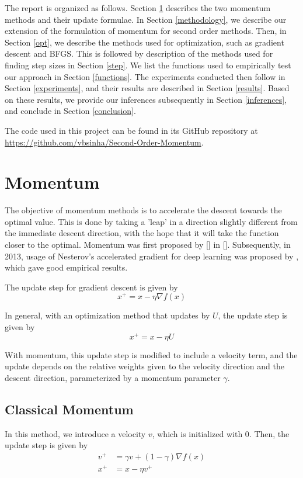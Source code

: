 \documentclass{article}
\begin{document}
The report is organized as follows. Section \ref{momentum} describes the two momentum methods and their update formulae. In Section \ref{methodology}, we describe our extension of the formulation of momentum for second order methods. Then, in Section \ref{opt}, we describe the methods used for optimization, such as gradient descent and BFGS. This is followed by description of the methods used for finding step sizes in Section \ref{step}. We list the functions used to empirically test our approach in Section \ref{functions}. The experiments conducted then follow in Section \ref{experiments}, and their results are described in Section \ref{results}. Based on these results, we provide our inferences subsequently in Section \ref{inferences}, and conclude in Section \ref{conclusion}.

The code used in this project can be found in its GitHub repository at \url{https://github.com/vbsinha/Second-Order-Momentum}.

\section{Momentum}\label{momentum}

The objective of momentum methods is to accelerate the descent towards the optimal value. This is done by taking a 'leap' in a direction slightly different from the immediate descent direction, with the hope that it will take the function closer to the optimal.
Momentum was first proposed by [] in []. Subsequently, in 2013, usage of Nesterov's accelerated gradient for deep learning was proposed by \citet{Sutskever}, which gave good empirical results.

The update step for gradient descent is given by
\begin{equation}
x^+ = x - \eta \nabla f(x)
\end{equation}

In general, with an optimization method that updates by $U$, the update step is given by
\begin{equation}
x^+ = x - \eta U
\end{equation}

With momentum, this update step is modified to include a velocity term, and the update depends on the relative weights given to the velocity direction and the descent direction, parameterized by a momentum parameter $\gamma$.

\subsection{Classical Momentum}
In this method, we introduce a velocity $v$, which is initialized with $0$. Then, the update step is given by
\begin{align}
v^+ &= \gamma v + (1-\gamma) \nabla f(x) \\
x^+ &= x - \eta v^+
\end{align}
\end{document}

